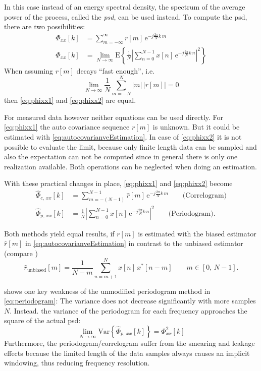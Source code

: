 In this case instead of an energy spectral density, the spectrum of the average power of the process, called the \textit{\gls{psd}}, can be used instead.
To compute the \gls{psd}, there are two possibilities:
\begin{align}
\Phi_{xx}[k] &= \sum_{m=-\infty}^{\infty} r[m]\,\text{e}^{-j\frac{2\pi}{N}k\,m} \label{eq:phixx1}\\
\Phi_{xx}[k] &= \lim_{N\rightarrow\infty} \text{E}\left\{\frac{1}{N}\left|\sum_{n=0}^{N-1} x[n]\,\text{e}^{-j\frac{2\pi}{N}k\,n}\right|^2 \right\} \label{eq:phixx2}
\end{align}
When assuming $r[m]$ decays ``fast enough'', i.e.
\begin{equation}
\lim_{N\rightarrow\infty} \frac{1}{N} \sum_{m=-N}^{N} |m|\,\left|r[m]\right| = 0
\end{equation}
then \autoref{eq:phixx1} and \autoref{eq:phixx2} are equal. \cite[p.~7]{Stoica1997}

For measured data however neither equations can be used directly.
For \autoref{eq:phixx1} the auto covariance sequence $r[m]$ is unknown.
But it could be estimated with \autoref{eq:autocovarianveEstimation}. In case of \autoref{eq:phixx2} it is not possible to evaluate the limit, because only finite length data can be sampled and also the expectation can not be computed since in general there is only one realization available. Both operations can be neglected when doing an estimation.

With these practical changes in place, \autoref{eq:phixx1} and \autoref{eq:phixx2} become
\begin{align}
\hat{\Phi}_{c,\,xx}[k] &= \sum_{m=-(N-1)}^{N-1} \hat{r}[m]\,\text{e}^{-j\frac{2\pi}{N}k\,m} \label{eq:phiCxx1}\qquad\text{(Correlogram)}\\
\hat{\Phi}_{p,\,xx}[k] &= \frac{1}{N} \left| \sum_{n=0}^{N-1} x[n]\,\text{e}^{-j\frac{2\pi}{N}k\,n}\right|^2\qquad\text{(Periodogram)}\label{eq:periodogram}.
\end{align}

Both methods yield equal results, if $r[m]$ is estimated with the biased estimator $\hat{r}[m]$ in \autoref{eq:autocovarianveEstimation} in contrast to the unbiased estimator (compare \cite[p.~24]{Stoica1997})
\begin{equation}
\hat{r}_{\text{unbiased}}[m] = \frac{1}{N-m} \sum_{n=m+1}^{N} x[n]\,x^\ast[n-m]\qquad m \in [0,\,N-1].
\end{equation}

\cite{Rowell2008} shows one key weakness of the unmodified periodogram method in \autoref{eq:periodogram}: The variance does not decrease significantly with more samples $N$. Instead. the variance of the periodogram for each frequency approaches the square of the actual \gls{psd}:
\begin{equation}
\lim_{N\rightarrow\infty} \text{Var}\left\{\hat{\Phi}_{p,\,xx}[k]\right\} = \Phi_{xx}^2[k]
\end{equation}
Furthermore, the periodogram/correlogram suffer from the smearing and leakage effects because the limited length of the data samples always causes an implicit windowing, thus reducing frequency resolution.\\

